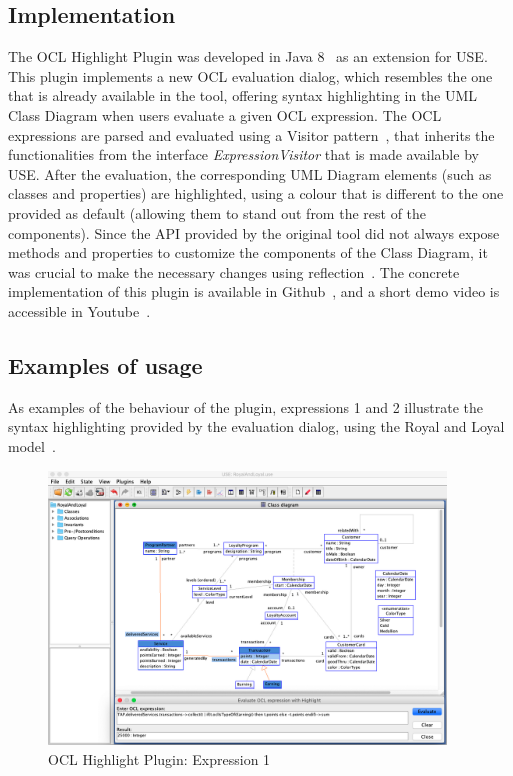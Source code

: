 \subsection{Implementation}

The OCL Highlight Plugin was developed in Java 8~\cite{java} as an extension for USE. This plugin implements a new OCL evaluation dialog, which resembles the one that is already available in the tool, offering syntax highlighting in the UML Class Diagram when users evaluate a given OCL expression. The OCL expressions are parsed and evaluated using a Visitor pattern~\cite{visitor}, that inherits the functionalities from the interface \textit{ExpressionVisitor} that is made available by USE. After the evaluation, the corresponding UML Diagram elements (such as classes and properties) are highlighted, using a colour that is different to the one provided as default (allowing them to stand out from the rest of the components). Since the API provided by the original tool did not always expose methods and properties to customize the components of the Class Diagram, it was crucial to make the necessary changes using reflection~\cite{reflection}. The concrete implementation of this plugin is available in Github~\cite{useOCLHighlightPlugin}, and a short demo video is accessible in Youtube~\cite{useOCLHighlightPluginDemo}.
 
\subsection{Examples of usage}
\label{chap:Implementation-OCLHighlightPlugin-Examples}

As examples of the behaviour of the plugin, expressions 1 and 2 illustrate the syntax highlighting provided by the evaluation dialog, using the Royal and Loyal model~\cite{Warmer2003}.

\begin{figure}[ht]
    \centering
    \includegraphics[width=0.94\textwidth]{Chapters/figures/5_Implementation/01_Expression_1}
    \caption{OCL Highlight Plugin: Expression 1}
    \label{fig:01_oclhighlightplugin}
\end{figure}

